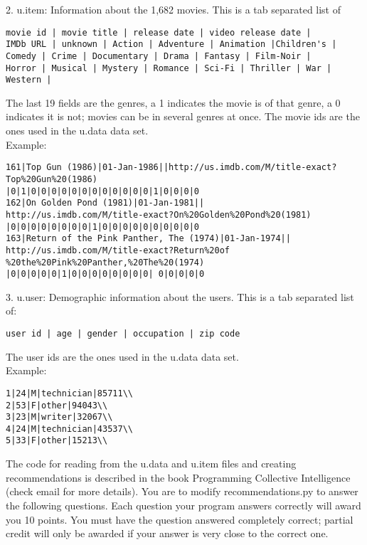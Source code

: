 \documentclass[letterpaper,11pt]{article}
\begin{document}
2.  u.item: Information about the 1,682 movies. This is a tab separated list of\\
\begin{verbatim}
movie id | movie title | release date | video release date |
IMDb URL | unknown | Action | Adventure | Animation |Children's |
Comedy | Crime | Documentary | Drama | Fantasy | Film-Noir |
Horror | Musical | Mystery | Romance | Sci-Fi | Thriller | War |
Western |
\end{verbatim}

The last 19 fields are the genres, a 1 indicates the movie is of
that genre, a 0 indicates it is not; movies can be in several genres
at once. The movie ids are the ones used in the u.data data set.\\

Example:
\begin{verbatim}
161|Top Gun (1986)|01-Jan-1986||http://us.imdb.com/M/title-exact?
Top%20Gun%20(1986)
|0|1|0|0|0|0|0|0|0|0|0|0|0|0|1|0|0|0|0 
162|On Golden Pond (1981)|01-Jan-1981||
http://us.imdb.com/M/title-exact?On%20Golden%20Pond%20(1981)
|0|0|0|0|0|0|0|0|1|0|0|0|0|0|0|0|0|0|0 
163|Return of the Pink Panther, The (1974)|01-Jan-1974||
http://us.imdb.com/M/title-exact?Return%20of
%20the%20Pink%20Panther,%20The%20(1974)
|0|0|0|0|0|1|0|0|0|0|0|0|0|0| 0|0|0|0|0
\end{verbatim}

3.  u.user: Demographic information about the users. This is a tab separated list of:
\begin{verbatim}
user id | age | gender | occupation | zip code
\end{verbatim}
The user ids are the ones used in the u.data data set.\\

Example:
\begin{verbatim}
1|24|M|technician|85711\\
2|53|F|other|94043\\
3|23|M|writer|32067\\
4|24|M|technician|43537\\ 
5|33|F|other|15213\\
\end{verbatim}
The code for reading from the u.data and u.item files and creating recommendations is described in the book Programming Collective
Intelligence (check email for more details). You are to modify recommendations.py to answer the following questions. Each question your program answers correctly will award you 10 points. You must have the question answered completely correct; partial credit will only be awarded if your answer is very close to the correct one.\\
\end{document}
